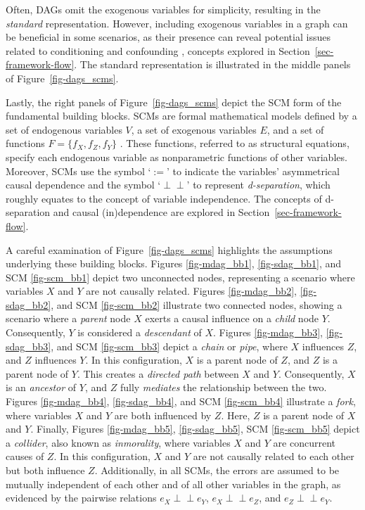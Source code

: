 \documentclass[
  authoryear,
  preprint,
  1p]{elsarticle}
\begin{document}
Often, DAGs omit the exogenous variables for simplicity, resulting in
the \emph{standard} representation. However, including exogenous
variables in a graph can be beneficial in some scenarios, as their
presence can reveal potential issues related to conditioning and
confounding \citep{Cinelli_et_al_2020}, concepts explored in
Section~\ref{sec-framework-flow}. The standard representation is
illustrated in the middle panels of Figure~\ref{fig-dags_scms}.

Lastly, the right panels of Figure~\ref{fig-dags_scms} depict the SCM
form of the fundamental building blocks. SCMs are formal mathematical
models defined by a set of endogenous variables \(V\), a set of
exogenous variables \(E\), and a set of functions
\(F=\{f_{X},f_{Z},f_{Y}\}\) \citep{Pearl_2009, Neal_2020}. These
functions, referred to as structural equations, specify each endogenous
variable as nonparametric functions of other variables. Moreover, SCMs
use the symbol `\(:=\)' to indicate the variables' asymmetrical causal
dependence and the symbol `\(\perp\!\!\!\perp\)' to represent
\emph{d-separation}, which roughly equates to the concept of variable
independence. The concepts of d-separation and causal (in)dependence are
explored in Section~\ref{sec-framework-flow}.

A careful examination of Figure~\ref{fig-dags_scms} highlights the
assumptions underlying these building blocks. Figures
\ref{fig-mdag_bb1}, \ref{fig-sdag_bb1}, and SCM \ref{fig-scm_bb1} depict
two unconnected nodes, representing a scenario where variables \(X\) and
\(Y\) are not causally related. Figures \ref{fig-mdag_bb2},
\ref{fig-sdag_bb2}, and SCM \ref{fig-scm_bb2} illustrate two connected
nodes, showing a scenario where a \emph{parent} node \(X\) exerts a
causal influence on a \emph{child} node \(Y\). Consequently, \(Y\) is
considered a \emph{descendant} of \(X\). Figures \ref{fig-mdag_bb3},
\ref{fig-sdag_bb3}, and SCM \ref{fig-scm_bb3} depict a \emph{chain} or
\emph{pipe}, where \(X\) influences \(Z\), and \(Z\) influences \(Y\).
In this configuration, \(X\) is a parent node of \(Z\), and \(Z\) is a
parent node of \(Y\). This creates a \emph{directed path} between \(X\)
and \(Y\). Consequently, \(X\) is an \emph{ancestor} of \(Y\), and \(Z\)
fully \emph{mediates} the relationship between the two. Figures
\ref{fig-mdag_bb4}, \ref{fig-sdag_bb4}, and SCM \ref{fig-scm_bb4}
illustrate a \emph{fork}, where variables \(X\) and \(Y\) are both
influenced by \(Z\). Here, \(Z\) is a parent node of \(X\) and \(Y\).
Finally, Figures \ref{fig-mdag_bb5}, \ref{fig-sdag_bb5}, SCM
\ref{fig-scm_bb5} depict a \emph{collider}, also known as
\emph{inmorality}, where variables \(X\) and \(Y\) are concurrent causes
of \(Z\). In this configuration, \(X\) and \(Y\) are not causally
related to each other but both influence \(Z\). Additionally, in all
SCMs, the errors are assumed to be mutually independent of each other
and of all other variables in the graph, as evidenced by the pairwise
relations \(e_{X} \perp\!\!\!\perp e_{Y}\),
\(e_{X} \perp\!\!\!\perp e_{Z}\), and \(e_{Z} \perp\!\!\!\perp e_{Y}\).
\end{document}
